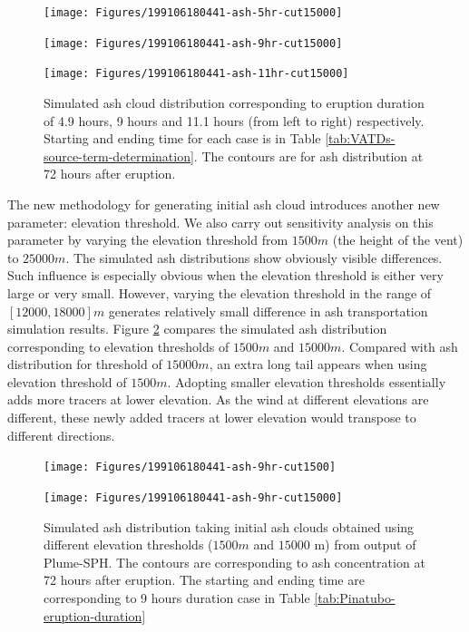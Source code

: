 \documentclass[draft,linenumbers]{agujournal2019}
\begin{document}
\begin{figure}[!htb]
    \centering
    \begin{minipage}{.325\textwidth}
        \centering
        \texttt{[image: Figures/199106180441-ash-5hr-cut15000]}
    \end{minipage}%
    \begin{minipage}{.325 \textwidth}
        \centering
        \texttt{[image: Figures/199106180441-ash-9hr-cut15000]}
    \end{minipage}%
    \begin{minipage}{.325 \textwidth}
        \centering
        \texttt{[image: Figures/199106180441-ash-11hr-cut15000]}
    \end{minipage}%
    \caption{Simulated ash cloud distribution corresponding to eruption duration of 4.9 hours, 9 hours and 11.1 hours (from left to right) respectively. Starting and ending time for each case is in Table \ref{tab:VATDs-source-term-determination}. The contours are for ash distribution at 72 hours after eruption.}
    \label{fig:Puff-sensitivity-duration}
\end{figure}

The new methodology for generating initial ash cloud introduces another new parameter: elevation threshold. We also carry out sensitivity analysis on this parameter by varying the elevation threshold from $1500 m$ (the height of the vent) to $25000 m$. The simulated ash distributions show obviously visible differences. Such influence is especially obvious when the elevation threshold is either very large or very small. However, varying the elevation threshold in the range of $[12000, 18000] m$ generates relatively small difference in ash transportation simulation results. Figure \ref{fig:Puff-sensitivity-elevation-threshold} compares the simulated ash distribution corresponding to elevation thresholds of $1500 m$ and $15000 m$. Compared with ash distribution for threshold of $15000 m$, an extra long tail appears when using elevation threshold of $1500 m$. Adopting smaller elevation thresholds essentially adds more tracers at lower elevation. As the wind at different elevations are different, these newly added tracers at lower elevation would transpose to different directions.

\begin{figure}[!htb]
    \centering
    \begin{minipage}{.325\textwidth}
        \centering
        \texttt{[image: Figures/199106180441-ash-9hr-cut1500]}
    \end{minipage}%
    \begin{minipage}{.325 \textwidth}
        \centering
        \texttt{[image: Figures/199106180441-ash-9hr-cut15000]}
    \end{minipage}%
    \caption{Simulated ash distribution taking initial ash clouds obtained using different elevation thresholds ($1500 m$ and $15000$ m) from output of Plume-SPH. The contours are corresponding to ash concentration at 72 hours after eruption. The starting and ending time are corresponding to 9 hours duration case in Table \ref{tab:Pinatubo-eruption-duration}}
    \label{fig:Puff-sensitivity-elevation-threshold}
\end{figure}
\end{document}
